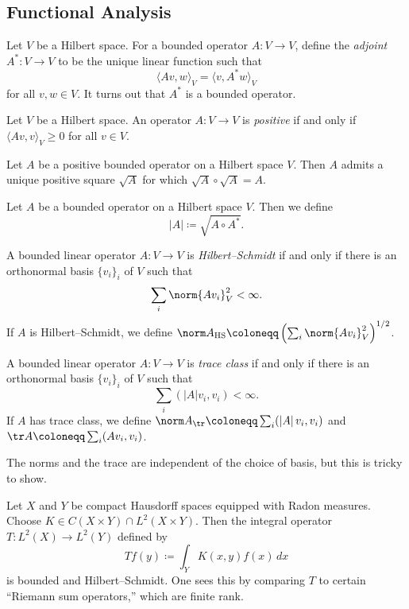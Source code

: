 \documentclass{article}
\begin{document}
\subsection{Functional Analysis}
\begin{definition}
	Let $V$ be a Hilbert space. For a bounded operator $A\colon V\to V$, define the \textit{adjoint} $A^*\colon V\to V$ to be the unique linear function such that
	\[\langle Av,w\rangle_V=\langle v,A^*w\rangle_V\]
	for all $v,w\in V$. It turns out that $A^*$ is a bounded operator.
\end{definition}
\begin{definition}
	Let $V$ be a Hilbert space. An operator $A\colon V\to V$ is \textit{positive} if and only if $\langle Av,v\rangle_V\ge0$ for all $v\in V$.
\end{definition}
\begin{lemma}
	Let $A$ be a positive bounded operator on a Hilbert space $V$. Then $A$ admits a unique positive square $\sqrt A$ for which $\sqrt A\circ\sqrt A=A$.
\end{lemma}
\begin{notation}
	Let $A$ be a bounded operator on a Hilbert space $V$. Then we define
	\[\left|A\right|\coloneqq\sqrt{A\circ A^*}.\]
\end{notation}
\begin{definition}[compact]
	A bounded linear operator $A\colon V\to V$ is \textit{Hilbert--Schmidt} if and only if there is an orthonormal basis $\{v_i\}_i$ of $V$ such that
	\[\sum_i\norm{Av_i}_V^2<\infty.\]
	If $A$ is Hilbert--Schmidt, we define $\norm A_{\mathrm{HS}}\coloneqq\left(\sum_i\norm{Av_i}_V^2\right)^{1/2}$.
\end{definition}
\begin{definition}
	A bounded linear operator $A\colon V\to V$ is \textit{trace class} if and only if there is an orthonormal basis $\{v_i\}_i$ of $V$ such that
	\[\sum_i(\left|A\right|v_i,v_i)<\infty.\]
	If $A$ has trace class, we define $\norm A_{\tr}\coloneqq\sum_i(\left|A\right|v_i,v_i)$ and $\tr A\coloneqq\sum_i(Av_i,v_i)$.
\end{definition}
\begin{remark}
	The norms and the trace are independent of the choice of basis, but this is tricky to show.
\end{remark}
\begin{example}
	Let $X$ and $Y$ be compact Hausdorff spaces equipped with Radon measures. Choose $K\in C(X\times Y)\cap L^2(X\times Y)$. Then the integral operator $T\colon L^2(X)\to L^2(Y)$ defined by
	\[Tf(y)\coloneqq\int_YK(x,y)f(x)\,dx\]
	is bounded and Hilbert--Schmidt. One sees this by comparing $T$ to certain ``Riemann sum operators,'' which are finite rank.
\end{example}
\end{document}
